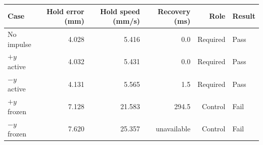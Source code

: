 \begin{tabular}{lrrrrl}
\toprule
Case & Hold error (mm) & Hold speed (mm/s) & Recovery (ms) & Role & Result \\
\midrule
No impulse & 4.028 & 5.416 & 0.0 & Required & Pass \\
$+y$ active & 4.032 & 5.431 & 0.0 & Required & Pass \\
$-y$ active & 4.131 & 5.565 & 1.5 & Required & Pass \\
\midrule
$+y$ frozen & 7.128 & 21.583 & 294.5 & Control & Fail \\
$-y$ frozen & 7.620 & 25.357 & unavailable & Control & Fail \\
\bottomrule
\end{tabular}

